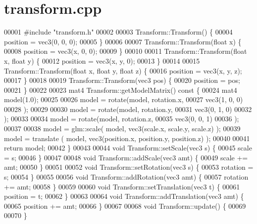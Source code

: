 \section{transform.\+cpp}
\label{transform_8cpp_source}

\begin{DoxyCode}
00001 \textcolor{preprocessor}{#include "transform.h"}
00002 
00003 Transform::Transform() \{
00004     position = vec3(0, 0, 0);
00005 \}
00006 
00007 Transform::Transform(\textcolor{keywordtype}{float} x) \{
00008     position = vec3(x, 0, 0);
00009 \}
00010 
00011 Transform::Transform(\textcolor{keywordtype}{float} x, \textcolor{keywordtype}{float} y) \{
00012     position = vec3(x, y, 0);
00013 \}
00014 
00015 Transform::Transform(\textcolor{keywordtype}{float} x, \textcolor{keywordtype}{float} y, \textcolor{keywordtype}{float} z) \{
00016     position = vec3(x, y, z);
00017 \}
00018 
00019 Transform::Transform(vec3 pos) \{
00020     position = pos;
00021 \}
00022 
00023 mat4 Transform::getModelMatrix()\textcolor{keyword}{ const }\{
00024     mat4 model(1.0);
00025 
00026      model = rotate(model, rotation.x, 
00027         vec3(1, 0, 0)
00028     );
00029 
00030     model = rotate(model, rotation.y, 
00031         vec3(0, 1, 0)
00032     );
00033 
00034     model = rotate(model, rotation.z, 
00035         vec3(0, 0, 1)
00036     );
00037 
00038     model = glm::scale( model, vec3(scale.x, scale.y, scale.z) );
00039     model = translate ( model, vec3(position.x, position.y, position.z) );
00040 
00041     \textcolor{keywordflow}{return} model;
00042 \}
00043 
00044 \textcolor{keywordtype}{void} Transform::setScale(vec3 s) \{
00045     scale = s;
00046 \}
00047 
00048 \textcolor{keywordtype}{void} Transform::addScale(vec3 amt) \{
00049     scale += amt;
00050 \}
00051 
00052 \textcolor{keywordtype}{void} Transform::setRotation(vec3 s) \{
00053     rotation = s;
00054 \}
00055 
00056 \textcolor{keywordtype}{void} Transform::addRotation(vec3 amt) \{
00057     rotation += amt;
00058 \}
00059 
00060 \textcolor{keywordtype}{void} Transform::setTranslation(vec3 t) \{
00061     position = t;
00062 \}
00063 
00064 \textcolor{keywordtype}{void} Transform::addTranslation(vec3 amt) \{
00065     position += amt;
00066 \}
00067 
00068 \textcolor{keywordtype}{void} Transform::update() \{
00069 
00070 \}
\end{DoxyCode}
